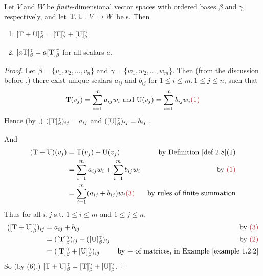 \begin{theorem} \label{thm 2.8}
Let \(V\) and \(W\) be \emph{finite}-dimensional vector spaces with ordered bases \(\beta\) and \(\gamma\), respectively, and let \(\mathrm{T}, \mathrm{U}: V \to W\) be \LTRAN{}s.
Then
\begin{enumerate}
\item \([\mathrm{T} + \mathrm{U}]_{\beta}^{\gamma} = [\mathrm{T}]_{\beta}^{\gamma} + [\mathrm{U}]_{\beta}^{\gamma}\)
\item \([a\mathrm{T}]_{\beta}^{\gamma} = a[\mathrm{T}]_{\beta}^{\gamma}\) for all scalars \(a\).
\end{enumerate}
\end{theorem}

\begin{proof}
Let \(\beta = \{ v_1, v_2, ..., v_n \}\) and \(\gamma = \{ w_1, w_2, ..., w_m \}\).
Then (from the discussion before ,) there exist unique scalars \(a_{ij}\) and \(b_{ij}\) for \(1 \le i \le m, 1 \le j \le n\), such that
\[
    \T(v_j) = \sum_{i = 1}^m a_{ij} w_i \text{ and } \U(v_j) = \sum_{i = 1}^m b_{ij} w_i \MAROON{(1)}
\]
Hence (by ,) \(([\mathrm{T}]_{\beta}^{\gamma})_{ij} = a_{ij}\) and \(([\mathrm{U}]_{\beta}^{\gamma})_{ij} = b_{ij}\) .

And
\begin{align*}
    (\T + \U)(v_j) & = \T(v_j) + \U(v_j) & \text{by \DEF{2.8}(1)} \\
                   & = \sum_{i = 1}^m a_{ij} w_i + \sum_{i = 1}^m b_{ij} w_i & \text{by \MAROON{(1)}} \\
                   & = \sum_{i = 1}^m (a_{ij} + b_{ij}) w_i \MAROON{(3)} & \text{by rules of finite summation}
\end{align*}
Thus for all \(i, j\) s.t. \(1 \le i \le m\) and \(1 \le j \le n\),
\begin{align*}
    ([\T + \U]_{\beta}^{\gamma})_{ij} & = a_{ij} + b_{ij} & \text{by \MAROON{(3)}} \\
                                      & = ([\T]_{\beta}^{\gamma})_{ij} + ([\U]_{\beta}^{\gamma})_{ij} & \text{by \MAROON{(2)}} \\
                                      & = ([\T]_{\beta}^{\gamma} + [\U]_{\beta}^{\gamma})_{ij} & \text{by \(+\) of matrices, in \EXAMPLE{1.2.2}}
\end{align*}
So (by (6),) \([\mathrm{T} + \mathrm{U}]_{\beta}^{\gamma} = [\mathrm{T}]_{\beta}^{\gamma} + [\mathrm{U}]_{\beta}^{\gamma}\).


\end{proof}
